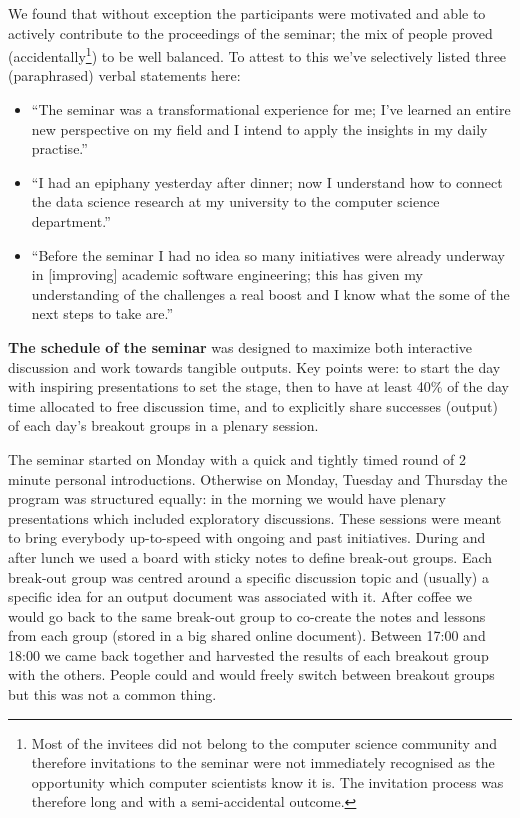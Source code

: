 \documentclass[a4paper,UKenglish]{dagrep}
\begin{document}
We found that without exception the participants were motivated and able to actively contribute to the proceedings of the seminar; the mix of people proved (accidentally\footnote{Most of the invitees did not belong to the computer science community and therefore invitations to the seminar were not immediately recognised as the opportunity which computer scientists know it is. The invitation process was therefore long and with a semi-accidental outcome.}) to be well balanced. To attest to this we've selectively listed three (paraphrased) verbal statements here:
\begin{itemize}
\item ``The seminar was a transformational experience for me; I've learned an entire new perspective on my field and I intend to apply the insights in my daily practise.''
\item ``I had an epiphany yesterday after dinner; now I understand how to connect the data science research at my university to the computer science department.''
\item ``Before the seminar I had no idea so many initiatives were already underway in [improving] academic software engineering; this has given my understanding of the challenges a real boost and I know what the some of the next steps to take are.''
\end{itemize}

\textbf{The schedule of the seminar} was designed to maximize both interactive discussion and work towards tangible outputs. Key points were: to start the day with inspiring presentations to set the stage, then to have at least 40\% of the day time allocated to free discussion time, and to explicitly share successes (output) of each day's breakout groups in a plenary session.

The seminar started on Monday with a quick and tightly timed round of 2 minute personal introductions. Otherwise on Monday, Tuesday and Thursday the program was structured equally: in the morning we would have plenary presentations which included exploratory discussions. These sessions were meant to bring everybody up-to-speed with ongoing and past initiatives. During and after lunch we used a board with sticky notes to define break-out groups. Each break-out group was centred around a specific discussion topic and (usually) a specific idea for an output document was associated with it. After coffee we would go back to the same break-out group to co-create the notes and lessons from each group (stored in a big shared online document). Between 17:00 and 18:00 we came back together and harvested the results of each breakout group with the others. People could and would freely switch between breakout groups but this was not a common thing.
\end{document}
